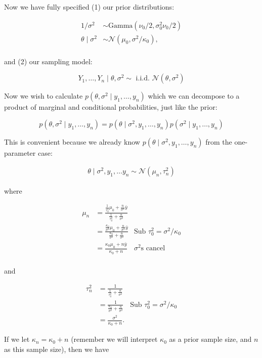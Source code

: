 \documentclass[]{article}
\begin{document}
Now we have fully specified (1) our prior distributions:

\begin{align}
1 / \sigma^2 &\sim \text{Gamma}(\nu_0 / 2, \sigma^2_0 \nu_0 / 2) \\
\theta \mid \sigma^2 &\sim \mathcal{N}(\mu_0, \sigma^2 / \kappa_0), \\
\end{align}

and (2) our sampling model:

\[
Y_1, \dots, Y_n \mid \theta, \sigma^2 \sim \text{ i.i.d. } \mathcal{N}(\theta,
\sigma^2)
\]

Now we wish to calculate \(p(\theta, \sigma^2 \mid y_1, \dots, y_n)\)
which we can decompose to a product of marginal and conditional
probabilities, just like the prior:

\[
p(\theta, \sigma^2 \mid y_1, \dots, y_n) =  p(\theta \mid \sigma^2, y_1, \dots, y_n) p(\sigma^2 \mid y_1, \dots, y_n)
\]

This is convenient because we already know
\(p(\theta \mid \sigma^2, y_1, \dots, y_n)\) from the one-parameter
case:

\begin{align}
\theta \mid \sigma^2, y_1, \dots y_n \sim \mathcal{N}(\mu_n, \tau_n^2)
\end{align}

where

\begin{align}
\mu_n &= \frac{ \frac{1}{\tau_0^2} \mu_0 + \frac{n}{\sigma^2} \bar{y} }{ \frac{1}{\tau_0^2} + \frac{n}{\sigma^2} } \\
&= \frac{ \frac{\kappa_0}{\sigma^2} \mu_0 + \frac{n}{\sigma^2} \bar{y} }{ \frac{\kappa_0}{\sigma^2} + \frac{n}{\sigma^2} } & \text{Sub $\tau_0^2 = \sigma^2 / \kappa_0$} \\
&= \frac{ \kappa_0 \mu_0 + n \bar{y} } { \kappa_0 + n } & \text{$\sigma^2$s cancel} \\
\end{align}

and

\begin{align}
\tau_n^2 &= \frac{1}{\frac{1}{\tau_0^2} + \frac{n}{\sigma^2}} \\
&= \frac{1}{\frac{\kappa_0}{\sigma^2} + \frac{n}{\sigma^2}} & \text{Sub $\tau_0^2 = \sigma^2 / \kappa_0$} \\
&= \frac{\sigma^2}{\kappa_0 + n}.
\end{align}

If we let \(\kappa_n = \kappa_0 + n\) (remember we will interpret
\(\kappa_0\) as a prior sample size, and \(n\) as this sample size),
then we have
\end{document}
